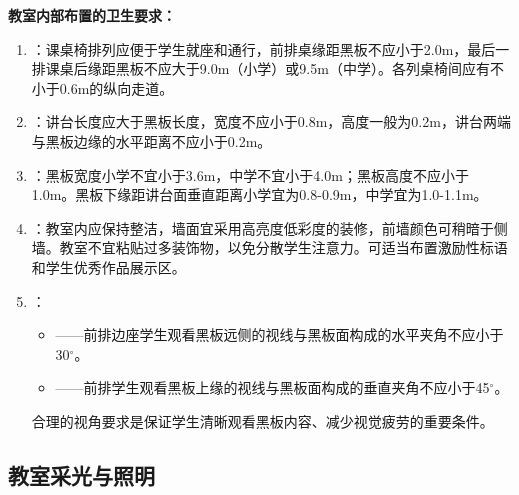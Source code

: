 \begin{defbox}
\textbf{教室内部布置的卫生要求：}

\begin{enumerate}[leftmargin=*]
    \item {}：课桌椅排列应便于学生就座和通行，前排桌缘距黑板不应小于2.0m，最后一排课桌后缘距黑板不应大于9.0m（小学）或9.5m（中学）。各列桌椅间应有不小于0.6m的纵向走道。

    \item {}：讲台长度应大于黑板长度，宽度不应小于0.8m，高度一般为0.2m，讲台两端与黑板边缘的水平距离不应小于0.2m。

    \item {}：黑板宽度小学不宜小于3.6m，中学不宜小于4.0m；黑板高度不应小于1.0m。黑板下缘距讲台面垂直距离小学宜为0.8-0.9m，中学宜为1.0-1.1m。

    \item {}：教室内应保持整洁，墙面宜采用高亮度低彩度的装修，前墙颜色可稍暗于侧墙。教室不宜粘贴过多装饰物，以免分散学生注意力。可适当布置激励性标语和学生优秀作品展示区。

    \item {}：
    \begin{itemize}
        \item {}——前排边座学生观看黑板远侧的视线与黑板面构成的水平夹角不应小于30$^\circ$。
        \item {}——前排学生观看黑板上缘的视线与黑板面构成的垂直夹角不应小于45$^\circ$。
    \end{itemize}
    合理的视角要求是保证学生清晰观看黑板内容、减少视觉疲劳的重要条件。
\end{enumerate}
\end{defbox}

\subsection{教室采光与照明}


